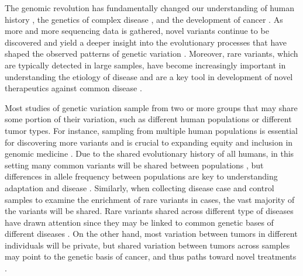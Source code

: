 
The genomic revolution has fundamentally changed our understanding of human history \citep{green2010draft, gravel2011demographic, tennessen2012evolution, lazaridis2014ancient, haak2015massive}, the genetics of complex disease \citep{lek2016analysis, karczewski2020mutational, wang2021rare, backman2021exome,chen2023genomic}, and the development of cancer \citep{cancer2008comprehensive, cancer2013cancer, kandoth2013mutational, jayasinghe2018systematic, hoadley2018cell, huang2018pathogenic}. As more and more sequencing data is gathered, novel variants continue to be discovered \citep{lek2016analysis, karczewski2020mutational} and yield a deeper insight into the evolutionary processes that have shaped the observed patterns of genetic variation \citep{agarwal2021mutation, agarwal2023relating}. Moreover, rare variants, which are typically detected in large samples, have become increasingly important in understanding the etiology of disease and are a key tool in development of novel therapeutics against common disease \citep{szustakowski2021advancing}.

Most studies of genetic variation sample from two or more groups that may share some portion of their variation, such as different human populations or different tumor types. For instance, sampling from multiple human populations is essential for discovering more variants \citep{karczewski2020mutational,chen2023genomic} and is crucial to expanding equity and inclusion in genomic medicine \citep{popejoy2016genomics, hindorff2018prioritizing, fatumo2022roadmap}. Due to the shared evolutionary history of all humans, in this setting many common variants will be shared between populations \citep{biddanda2020variant}, but differences in allele frequency between populations are key to understanding adaptation \citep{novembre2009spatial} and disease \citep{fu2011multi, assimes2021large, roselli2018multi}. Similarly, when collecting disease case and control samples to examine the enrichment of rare variants in cases, the vast majority of the variants will be shared. Rare variants shared across different type of diseases have drawn attention since they may be linked to common genetic bases of different diseases \citep{rafnar2009sequence, bojesen2013multiple, rashkin2020pan}. On the other hand, most variation between tumors in different individuals will be private, but shared variation between tumors across samples may point to the genetic basis of cancer, and thus paths toward novel treatments \citep{st2014genomic, ma2015rise,prior2020frequency,pirozzi2021implications}.


